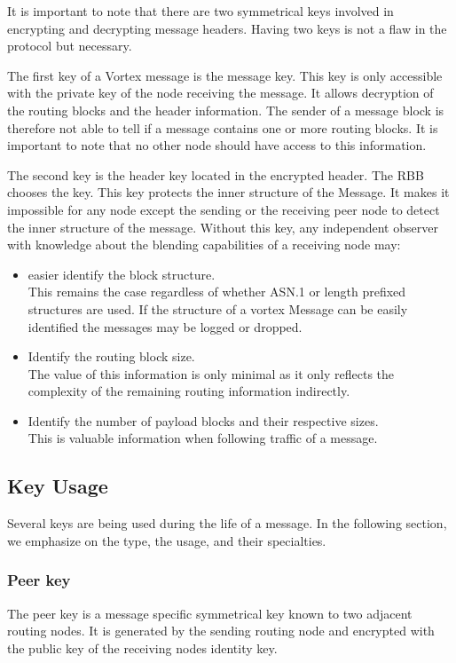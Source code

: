 It is important to note that there are two symmetrical keys involved in encrypting and decrypting message headers. Having two keys is not a flaw in the protocol but necessary. 

The first key of a Vortex message is the message key. This key is only accessible with the private key of the node receiving the message. It allows decryption of the routing blocks and the header information. The sender of a message block is therefore not able to tell if a message contains one or more routing blocks. It is important to note that no other node should have access to this information. 

The second key is the header key located in the encrypted header. The RBB chooses the key. This key protects the inner structure of the Message. It makes it impossible for any node except the sending or the receiving peer node to detect the inner structure of the message. Without this key, any independent observer with knowledge about the blending capabilities of a receiving node may:
\begin{itemize}
	\item easier identify the block structure.\\ 
	      This remains the case regardless of whether ASN.1 or length prefixed structures are used. If the structure of a vortex Message can be easily identified the messages may be logged or dropped.
	\item Identify the routing block size.\\
	      The value of this information is only minimal as it only reflects the complexity of the remaining routing information indirectly.
	\item Identify the number of payload blocks and their respective sizes. \\
	      This is valuable information when following traffic of a message.
\end{itemize}

\subsection{Key Usage}
Several keys are being used during the life of a message. In the following section, we emphasize on the type, the usage, and their specialties.

\subsubsection{Peer key}
The peer key is a message specific symmetrical key known to two adjacent routing nodes. It is generated by the sending routing node and encrypted with the public key of the receiving nodes identity key.

